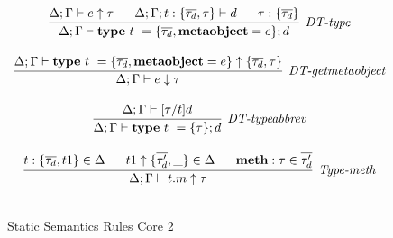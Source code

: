 \begin{figure}
\[\begin{array}{c}
\infer[\textit{DT-type}]
	{\Delta; \Gamma \vdash  \keyw{type}~ t~=\{\overline{\tau_d}, \keyw{metaobject}=e\}; d} 
	{\Delta; \Gamma \vdash e \uparrow\tau ~~~~~ \Delta; \Gamma; t:\{\overline{\tau_d},\tau\} \vdash d ~~~~~ \tau: \{\overline{\tau_d}\}  }\\[3ex]

\infer[\textit{DT-getmetaobject}]
        {\Delta; \Gamma \vdash e \downarrow \tau   }
	{\Delta; \Gamma \vdash  \keyw{type}~ t~=\{\overline{\tau_d}, \keyw{metaobject}=e\} \uparrow \{\overline{\tau_d},\tau\}} \\[3ex]
	

\infer[\textit{DT-typeabbrev}]
	{\Delta; \Gamma \vdash  \keyw{type}~ t~=\{\tau\}; d} 
	{\Delta; \Gamma \vdash [\tau/t]d }\\[3ex]


\infer[\textit{Type-meth}]
	{\Delta; \Gamma \vdash  t.m \uparrow\tau} 
	{t : \{\overline{\tau_d}, t1\} \in \Delta ~~~~~ t1  \uparrow \{\overline{\tau'_d},\_\} \in \Delta ~~~~~ \keyw{meth}:\tau \in \overline{\tau'_d}   }\\[3ex]
	

\end{array}
\]
\caption{Static Semantics Rules Core 2}
\end{figure}

